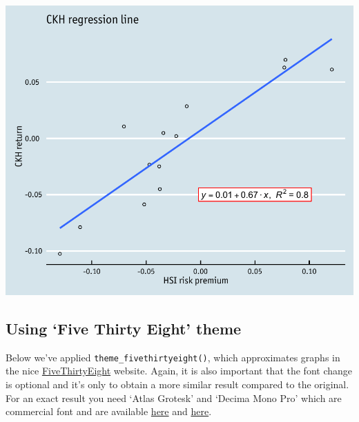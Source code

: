 \documentclass[]{article}
\begin{document}
\begin{center}\includegraphics{11_Linear_Regression_Plot_pdf/lr_16-1} \end{center}

\subsection{\texorpdfstring{Using `Five Thirty Eight'
theme}{Using Five Thirty Eight theme}}\label{using-five-thirty-eight-theme}

Below we've applied \texttt{theme\_fivethirtyeight()}, which
approximates graphs in the nice
\href{http://fivethirtyeight.com/}{FiveThirtyEight} website. Again, it
is also important that the font change is optional and it's only to
obtain a more similar result compared to the original. For an exact
result you need `Atlas Grotesk' and `Decima Mono Pro' which are
commercial font and are available
\href{https://commercialtype.com/catalog/atlas}{here} and
\href{https://www.myfonts.com/fonts/tipografiaramis/decima-mono-pro/}{here}.
\end{document}
